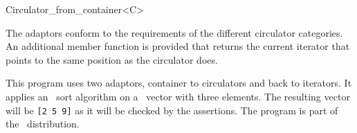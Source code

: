 \begin{ccClassTemplate}{Circulator_from_container<C>}

\ccOperations

The adaptors conform to the requirements of the different circulator
categories. An additional member function  is
provided that returns the current iterator that points to the same
position as the circulator does.

\ccExample

This program uses two adaptors, container to circulators and back to
iterators. It applies an \stl\ sort algorithm on a \stl\ vector with three
elements. The resulting vector will be {\tt [2 5 9]} as it will be
checked by the assertions. The program is part of the \cgal\ 
distribution.


\end{ccClassTemplate} 

